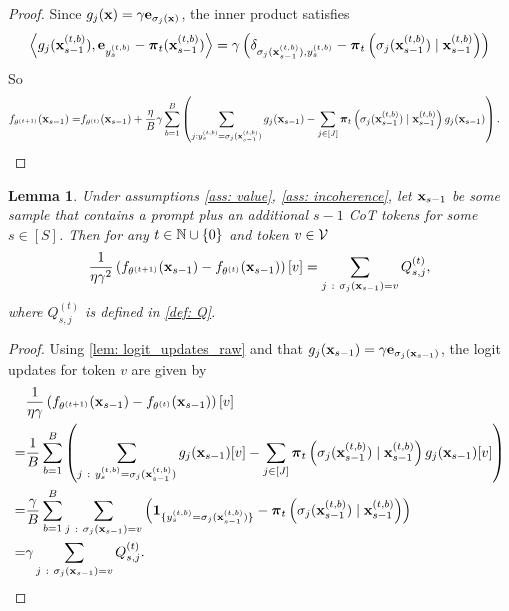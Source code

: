 \documentclass{article}
\theoremstyle{plain}
\newtheorem{lemma}[theorem]{Lemma}
\theoremstyle{definition}
\theoremstyle{remark}
\begin{document}
\begin{proof}
    Since $g_j(\mathbf{x}) = \gamma\mathbf{e}_{\sigma_j(\mathbf{x})}$, the inner product satisfies
    \begin{align*}
         \left\langle g_j(\mathbf{x}_{s-1}^{(t, b)}), \mathbf{e}_{y_{s}^{(t, b)}} - \boldsymbol{\pi}_t (\mathbf{x}_{s-1}^{(t, b)})\right\rangle 
         = \gamma\left(\delta_{\sigma_j(\mathbf{x}_{s-1}^{(t, b)}), y_{s}^{(t, b)}} - \boldsymbol{\pi}_t \left(\sigma_j(\mathbf{x}_{s-1}^{(t, b)})\mid \mathbf{x}_{s-1}^{(t, b)}\right)\right)
    \end{align*}
    So
    \begin{align*}
        f_{\theta^{(t+1)}}( \mathbf{x}_{s-1}) = & f_{\theta^{(t)}}( \mathbf{x}_{s-1}) + \frac{\eta}{B} \gamma \sum_{b=1}^B \left(\sum_{j :  y_{s}^{(t, b)} = \sigma_j(\mathbf{x}_{s-1}^{(t, b)}) } g_j( \mathbf{x}_{s-1}) - \sum_{j \in [J]} \boldsymbol{\pi}_t\left(\sigma_j(\mathbf{x}_{s-1}^{(t, b)}) \mid \mathbf{x}_{s-1}^{(t, b)}\right) g_j( \mathbf{x}_{s-1}) \right).
    \end{align*}
\end{proof}

\begin{lemma}\label{lem:logit_diff_raw}
    Under assumptions \ref{ass: value}, \ref{ass: incoherence}, let $ \mathbf{x}_{s-1}$ be some sample that contains a prompt plus an additional $s-1$ CoT tokens for some $s\in[S]$. Then for any $t\in \mathbb{N}\cup\{0\}$ and token $v\in\mathcal{V}$
    \begin{align*}
        \frac{1}{\eta \gamma^2} \left(f_{\theta^{(t+1)}}( \mathbf{x}_{s-1}) - f_{\theta^{(t)}}( \mathbf{x}_{s-1})\right)[v] = \sum_{j ~:~  \sigma_{j}(\mathbf{x}_{s-1}) = v} Q_{s, j}^{(t)},
    \end{align*}
    where $Q_{s, j}^{(t)}$ is defined in \eqref{def: Q}.
\end{lemma}
\begin{proof}
    Using \cref{lem: logit_updates_raw} and that $g_{j}( \mathbf{x}_{s-1}) = \gamma\mathbf{e}_{\sigma_j(\mathbf{x}_{s-1})}$, the logit updates for token $v$ are given by
    \begin{align*}
        & \frac{1}{\eta \gamma } \left(f_{\theta^{(t+1)}}( \mathbf{x}_{s-1}) - f_{\theta^{(t)}}( \mathbf{x}_{s-1})\right)[v] \\
        = & \frac{1}{B}\sum_{b=1}^B \left(\sum_{j ~:~  y_{s}^{(t, b)} = \sigma_{j}(\mathbf{x}_{s-1}^{(t, b)}) } g_{j}( \mathbf{x}_{s-1})[v]  - \sum_{j \in [J]} \boldsymbol{\pi}_t\left(\sigma_{j}(\mathbf{x}_{s-1}^{(t, b)}) \mid \mathbf{x}_{s-1}^{(t, b)}\right) g_{j}( \mathbf{x}_{s-1})[v]\right) \\ 
        = & \frac{\gamma}{B}\sum_{b=1}^B \sum_{j ~:~  \sigma_{j}(\mathbf{x}_{s-1}) =v} \left(\boldsymbol{1}_{\{ y_{s}^{(t, b)} = \sigma_{j}(\mathbf{x}_{s-1}^{(t, b)}) \}}  
        - \boldsymbol{\pi}_t\left(\sigma_{j}(\mathbf{x}_{s-1}^{(t, b)}) \mid \mathbf{x}_{s-1}^{(t, b)}\right)\right) \\
        = & \gamma \sum_{j ~:~  \sigma_{j}(\mathbf{x}_{s-1}) = v} Q_{s, j}^{(t)}.
    \end{align*}
\end{proof}
\end{document}
